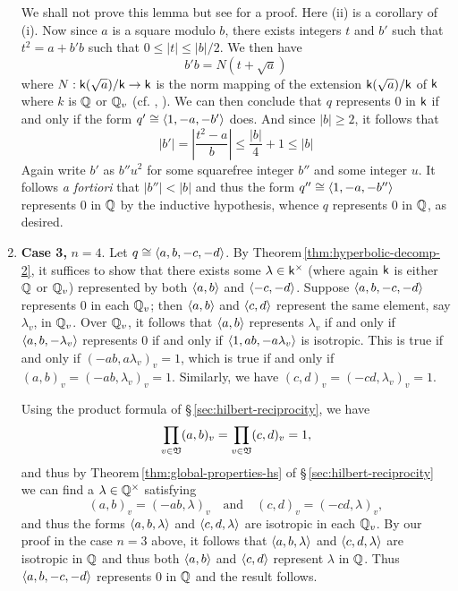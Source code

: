 \begin{enumerate}[wide, nosep, label=(\alph*)]
    We shall not prove this lemma but see \cite[p.~42]{serre2012course} for a proof. Here (ii) is a corollary of (i). Now since \(a\) is a square modulo \(b\), there exists integers \(t\) and \(b'\) such that \(t^2 = a + b'b\) such that \(0 \leq |t| \leq |b|/2\). We then have
    \[ b'b = N(t + \sqrt{a})\]
    where \(N: \mathsf{k}(\sqrt{a})/\mathsf{k} \to \mathsf{k}\) is the norm mapping of the extension \(\mathsf{k}(\sqrt{a})/\mathsf{k}\) of \(\mathsf{k}\) where \(k\) is \(\mathbb{Q}\) or \(\mathbb{Q}_v\) (cf. \cite[p.940]{rotman2010advanced}, \cite[p.~289]{hungerford2012algebra}). We can then conclude that \(q\) represents \(0\) in \(\mathsf{k}\) if and only if the form \(q' \cong \langle 1, -a, -b' \rangle\) does. And since \(|b| \geq 2\), it follows that
    \[
        |b'| = \left|\frac{t^2-a}{b}\right| \leq \frac{|b|}{4} + 1 \leq |b|
    \]
    Again write \(b'\) as \(b''u^2\) for some squarefree integer \(b''\) and some integer \(u\). It follows \emph{a fortiori} that \(|b''| < |b|\) and thus the form \(q'' \cong \langle 1, -a, -b'' \rangle\) represents \(0\) in \(\mathbb{Q}\) by the inductive hypothesis, whence \(q\) represents \(0\) in \(\mathbb{Q}\), as desired.

    \item \textbf{Case 3,} \(n = 4\). Let \(q \cong \langle a, b, -c, -d \rangle\). By Theorem\,\ref{thm:hyperbolic-decomp-2}, it suffices to show that there exists some \(\lambda \in \mathsf{k}^{\times}\) (where again \(\mathsf{k}\) is either \(\mathbb{Q}\) or \(\mathbb{Q}_v\)) represented by both \(\langle a, b \rangle\) and \(\langle -c, -d \rangle\). Suppose \(\langle a, b, -c, -d \rangle\) represents \(0\) in each \(\mathbb{Q}_v\); then \(\langle a, b \rangle\) and \(\langle c, d \rangle\) represent the same element, say \(\lambda_v\), in \(\mathbb{Q}_v\). Over \(\mathbb{Q}_v\), it follows that \(\langle a, b \rangle\) represents \(\lambda_v\) if and only if \(\langle a, b, -\lambda_v \rangle\) represents \(0\) if and only if \(\langle 1, ab, -a\lambda_v \rangle\) is isotropic. This is true if and only if \((-ab, a\lambda_v)_v = 1\), which is true if and only if \((a, b)_v = (-ab, \lambda_v)_v = 1\). Similarly, we have \((c,d)_v = (-cd, \lambda_v)_v = 1\).
    
    Using the product formula of \S\,\ref{sec:hilbert-reciprocity}, we have 
    \[
        \prod_{v \in \mathfrak{V}} (a, b)_v = \prod_{v \in \mathfrak{V}} (c, d)_v = 1,
    \]
    and thus by Theorem\,\ref{thm:global-properties-hs} of \S\,\ref{sec:hilbert-reciprocity} we can find a \(\lambda \in \mathbb{Q}^{\times}\) satisfying
    \[
        (a, b)_v = (-ab, \lambda)_v \quad \text{and} \quad (c, d)_v = (-cd, \lambda)_v,
    \]
    and thus the forms \(\langle a, b, \lambda \rangle\) and \(\langle c, d, \lambda \rangle\) are isotropic in each \(\mathbb{Q}_v\). By our proof in the case \(n = 3\) above, it follows that \(\langle a, b, \lambda \rangle\) and \(\langle c, d, \lambda \rangle\) are isotropic in \(\mathbb{Q}\) and thus both \(\langle a,b \rangle\) and \(\langle c,d \rangle\) represent \(\lambda\) in \(\mathbb{Q}\). Thus \(\langle a, b, -c, -d \rangle\) represents \(0\) in \(\mathbb{Q}\) and the result follows.
    

\end{enumerate}
